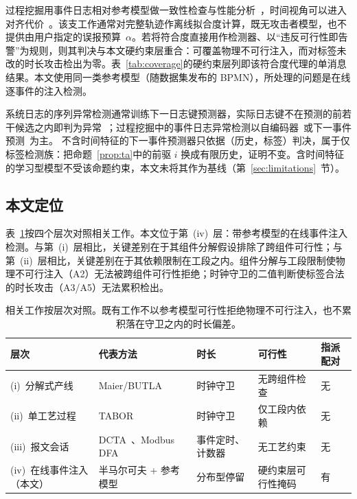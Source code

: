 \documentclass[manuscript,screen,review]{acmart}
\begin{document}
过程挖掘用事件日志相对参考模型做一致性检查与性能分析~\cite{aalst2012replay,adriansyah2011conformance}，时间视角可以进入对齐代价~\cite{rino2024timed}。该支工作通常对完整轨迹作离线拟合度计算，既无攻击者模型，也不提供由用户指定的误报预算~$\alpha$。若将符合度直接用作检测器、以``违反可行性即告警''为规则，则其判决与本文硬约束层重合：可覆盖物理不可行注入，而对标签未改的时长攻击检出为零。表~\ref{tab:coverage}的硬约束层列即该符合度代理的单消息结果。本文使用同一类参考模型（随数据集发布的 {BPMN}），所处理的问题是在线逐事件的注入检测。

系统日志的序列异常检测通常训练下一日志键预测器，实际日志键不在预测的前若干候选之内即判为异常~\cite{du2017deeplog,meng2019loganomaly,landauer2023deep}；过程挖掘中的事件日志异常检测以自编码器~\cite{nolle2018analyzing}或下一事件预测~\cite{nolle2022binet}为主。
不含时间特征的下一事件预测器只依据（历史，标签）判决，属于仅标签检测族：把命题~\ref{prop:ta}中的前驱 $i$ 换成有限历史，证明不变。含时间特征的学习型模型不受该命题约束，本文未将其作为基线（第~\ref{sec:limitations}~节）。

\subsection{本文定位}
\label{sec:rw_position}

表~\ref{tab:rw_comparison}按四个层次对照相关工作。本文位于第~(iv)~层：带参考模型的在线事件注入检测。与第~(i)~层相比，关键差别在于其组件分解假设排除了跨组件可行性；与第~(ii)~层相比，关键差别在于其依赖限制在工段之内。组件分解与工段限制使物理不可行注入（{A2}）无法被跨组件可行性拒绝；时钟守卫的二值判断使标签合法的时长攻击（{A3}/{A5}）无法累积检出。

\begin{table}[!t]
\renewcommand{\arraystretch}{1.25}
\caption{相关工作按层次对照。既有工作不以参考模型可行性拒绝物理不可行注入，也不累积落在守卫之内的时长偏差。}
\label{tab:rw_comparison}
\centering
\small
\begin{tabular}{p{2.4cm}p{2.6cm}p{2.2cm}p{2.4cm}p{2.2cm}}
\toprule
层次 & 代表方法 & 时长 & 可行性 & 指派配对 \\
\midrule
(i)~分解式产线
  & Maier/{BUTLA}~\cite{maier2011timed}
  & 时钟守卫
  & 无跨组件检查
  & 无 \\
(ii)~单工艺过程
  & {TABOR}~\cite{lin2018tabor}
  & 时钟守卫
  & 仅工段内依赖
  & 无 \\
(iii)~报文会话
  & {DCTA}~\cite{barsha2024dcta}、{Modbus} {DFA}~\cite{goldenberg2013modbus}
  & 事件定时、计数器
  & 无工艺约束
  & 无 \\
(iv)~在线事件注入（本文）
  & 半马尔可夫 + 参考模型
  & 分布型停留
  & 硬约束层可行性掩码
  & 有 \\
\bottomrule
\end{tabular}
\end{table}
\end{document}
